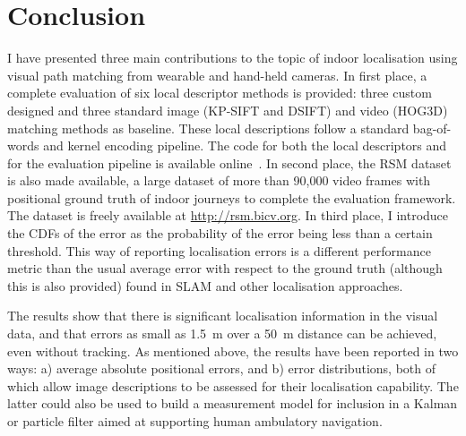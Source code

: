 \section{Conclusion}

I have presented three main contributions to the topic of indoor localisation using visual path matching from wearable and hand-held cameras. In first place, a complete evaluation of six local descriptor methods is provided: three custom designed and three standard image (KP-SIFT and DSIFT) and video (HOG3D) matching methods as baseline. These local descriptions follow a standard bag-of-words and kernel encoding pipeline. The code for both the local descriptors and for the evaluation pipeline is available online~\cite{jose_rivera_rubio_2015_33762}. In second place, the RSM dataset is also made available, a large dataset of more than 90,000 video frames with positional ground truth of indoor journeys to complete the evaluation framework. The dataset is freely available at \url{http://rsm.bicv.org}. In third place, I introduce the CDFs of the error as the probability of the error being less than a certain threshold. This way of reporting localisation errors is a different performance metric than the usual average error with respect to the ground truth (although this is also provided) found in SLAM and other localisation approaches.

The results show that there is significant localisation information in the visual data, and that errors as small as \SI{1.5}{m} over a \SI{50}{m} distance can be achieved, even without tracking. As mentioned above, the results have been reported in two ways: a) average absolute positional errors, and b) error distributions, both of which allow image descriptions to be assessed for their localisation capability.  The latter could also be used to build a measurement model for inclusion in a Kalman or particle filter  aimed at supporting human ambulatory navigation. 

